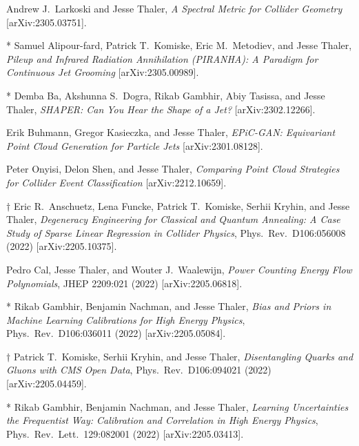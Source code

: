 \setcounter{jessecount}{124}

\begin{list}{[]\addtocounter{jessecount}{-1}}{\leftmargin=3em \itemsep=4pt}

\item
 Andrew J.\ Larkoski and Jesse Thaler,
\emph{A Spectral Metric for Collider Geometry}
[arXiv:2305.03751].

\item
* Samuel Alipour-fard, Patrick T.\ Komiske, Eric M.\ Metodiev, and Jesse Thaler,
\emph{Pileup and Infrared Radiation Annihilation (PIRANHA): A Paradigm for Continuous Jet Grooming}
[arXiv:2305.00989].

\item
* Demba Ba, Akshunna S.\ Dogra, Rikab Gambhir, Abiy Tasissa, and Jesse Thaler,
\emph{SHAPER: Can You Hear the Shape of a Jet?}
[arXiv:2302.12266].

\item
 Erik Buhmann, Gregor Kasieczka, and Jesse Thaler,
\emph{EPiC-GAN: Equivariant Point Cloud Generation for Particle Jets}
[arXiv:2301.08128].

\item
 Peter Onyisi, Delon Shen, and Jesse Thaler,
\emph{Comparing Point Cloud Strategies for Collider Event Classification}
[arXiv:2212.10659].

\item
$\dagger$ Eric R.\ Anschuetz, Lena Funcke, Patrick T.\ Komiske, Serhii Kryhin, and Jesse Thaler,
\emph{Degeneracy Engineering for Classical and Quantum Annealing: A Case Study of Sparse Linear Regression in Collider Physics},
Phys.\ Rev.\ D106:056008 (2022)
[arXiv:2205.10375].

\item
 Pedro Cal, Jesse Thaler, and Wouter J.\ Waalewijn,
\emph{Power Counting Energy Flow Polynomials},
JHEP 2209:021 (2022)
[arXiv:2205.06818].

\item
* Rikab Gambhir, Benjamin Nachman, and Jesse Thaler,
\emph{Bias and Priors in Machine Learning Calibrations for High Energy Physics},
Phys.\ Rev.\ D106:036011 (2022)
[arXiv:2205.05084].

\item
$\dagger$ Patrick T.\ Komiske, Serhii Kryhin, and Jesse Thaler,
\emph{Disentangling Quarks and Gluons with CMS Open Data},
Phys.\ Rev.\ D106:094021 (2022)
[arXiv:2205.04459].

\item
* Rikab Gambhir, Benjamin Nachman, and Jesse Thaler,
\emph{Learning Uncertainties the Frequentist Way: Calibration and Correlation in High Energy Physics},
Phys.\ Rev.\ Lett.\ 129:082001 (2022)
[arXiv:2205.03413].


\end{list}
